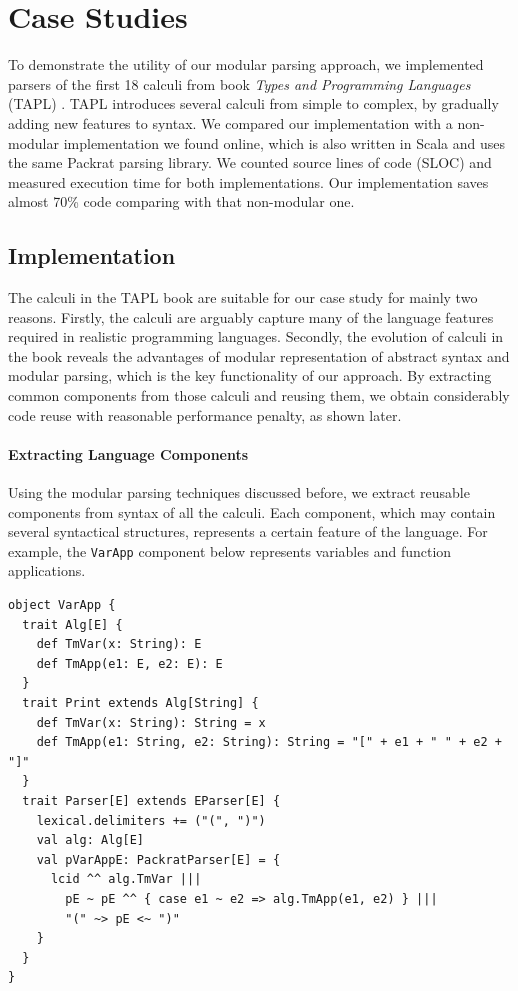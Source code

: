 \section{Case Studies}\label{sec:casestudy}


To demonstrate the utility of our modular parsing approach, we
implemented parsers of the first 18 calculi from book \textit{Types
  and Programming Languages} (TAPL) \cite{pierce2002types}. TAPL introduces several
calculi from simple to complex, by gradually adding new features to
syntax. We compared our implementation with a non-modular implementation
we found online, which is also written in Scala and uses the same Packrat parsing library.
We counted source lines of code (SLOC) and measured execution time for both implementations.
Our implementation saves almost 70\% code comparing with that non-modular one.


\subsection{Implementation}

The calculi in the TAPL book are suitable for our case study for mainly two reasons.
Firstly, the calculi are arguably capture many of the language features
required in realistic programming languages. Secondly, the evolution of
calculi in the book reveals the advantages of modular representation
of abstract syntax and modular parsing, which is the key functionality
of our approach. By extracting common components from those calculi
and reusing them, we obtain considerably code reuse with reasonable performance penalty, as shown later.

\paragraph{Extracting Language Components}
Using the modular parsing techniques discussed before, we extract
reusable components from syntax of all the calculi. Each
component, which may contain several syntactical structures,
represents a certain feature of the language. For
example, the \lstinline{VarApp} component below represents variables and
function applications.

\begin{lstlisting}
object VarApp {
  trait Alg[E] {
    def TmVar(x: String): E
    def TmApp(e1: E, e2: E): E
  }
  trait Print extends Alg[String] {
    def TmVar(x: String): String = x
    def TmApp(e1: String, e2: String): String = "[" + e1 + " " + e2 + "]"
  }
  trait Parser[E] extends EParser[E] {
    lexical.delimiters += ("(", ")")
    val alg: Alg[E]
    val pVarAppE: PackratParser[E] = {
      lcid ^^ alg.TmVar |||
        pE ~ pE ^^ { case e1 ~ e2 => alg.TmApp(e1, e2) } |||
        "(" ~> pE <~ ")"
    }
  }
}
\end{lstlisting}

